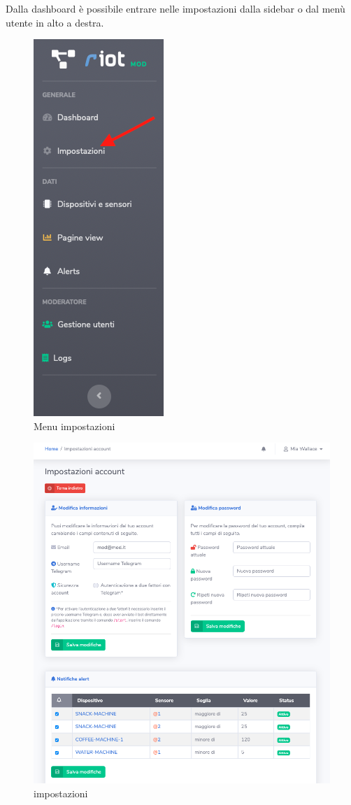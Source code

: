 	Dalla dashboard è possibile entrare nelle impostazioni dalla sidebar o dal menù utente in alto a destra.
	\begin{figure}[H]
		\centering
		\includegraphics[scale=0.600]{res/images/membro/menuImp.png}
		\caption{Menu impostazioni}
	\end{figure}
	\begin{figure}[H]
		\centering
		\includegraphics[scale=0.600]{res/images/membro/impostazioni.png}
		\caption{impostazioni}
	\end{figure}

